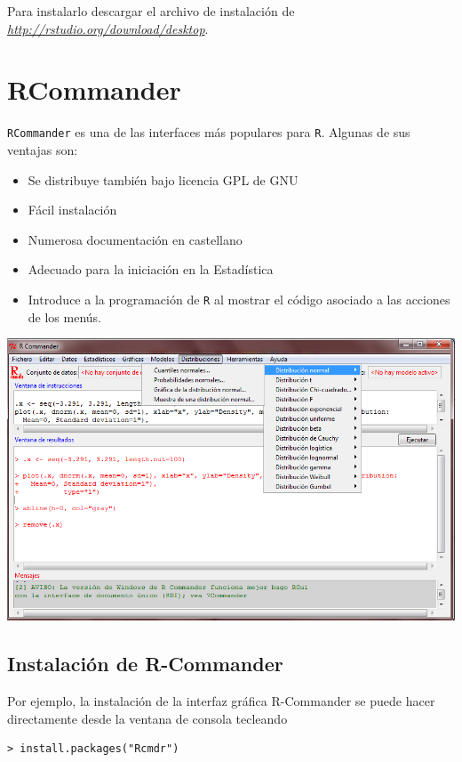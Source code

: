 \documentclass[]{book}
\begin{document}
Para instalarlo descargar el archivo de instalación de
\href{http://rstudio.org/download/desktop}{\emph{http://rstudio.org/download/desktop}}.

\hypertarget{rcmdr}{%
\section{RCommander}\label{rcmdr}}

\texttt{RCommander} es una de las interfaces más populares para \texttt{R}. Algunas de
sus ventajas son:

\begin{itemize}
\item
  Se distribuye también bajo licencia GPL de GNU
\item
  Fácil instalación
\item
  Numerosa documentación en castellano
\item
  Adecuado para la iniciación en la Estadística
\item
  Introduce a la programación de \texttt{R} al mostrar el código asociado a
  las acciones de los menús.
\end{itemize}

\includegraphics{figuras/Rcommander.png}

\hypertarget{instalacion-de-r-commander}{%
\subsection{Instalación de R-Commander}\label{instalacion-de-r-commander}}

Por ejemplo, la
instalación de la interfaz gráfica R-Commander se puede hacer
directamente desde la ventana de consola tecleando

\begin{verbatim}
> install.packages("Rcmdr")
\end{verbatim}
\end{document}
